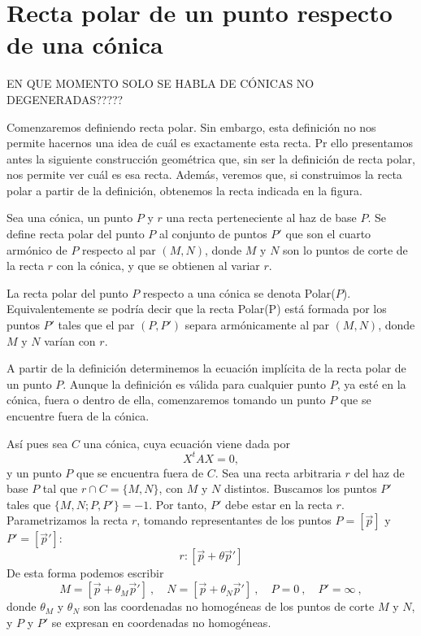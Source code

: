 \section{Recta polar de un punto respecto de una cónica}
EN QUE MOMENTO SOLO SE HABLA DE CÓNICAS NO DEGENERADAS?????

Comenzaremos definiendo recta polar. Sin embargo, esta definición no nos permite hacernos una idea de cuál es exactamente esta recta. Pr ello presentamos antes la siguiente construcción geométrica que, sin ser la definición de recta polar, nos permite ver cuál es esa recta. Además, veremos que, si construimos la recta polar a partir de la definición, obtenemos la recta indicada en la figura.
\begin{defi}
	Sea una cónica, un punto $P$ y $r$ una recta perteneciente al haz de base $P$. Se define recta polar del punto $P$ al conjunto de puntos $P'$ que son el cuarto armónico de $P$ respecto al par $(M,N)$, donde $M$ y $N$ son lo puntos de corte de la recta $r$ con la cónica, y que se obtienen al variar $r$.
\end{defi}

La recta polar del punto $P$ respecto a una cónica se denota Polar($P$). Equivalentemente se podría decir que la recta Polar(P) está formada por los puntos $P'$ tales que el par $(P,P')$ separa armónicamente al par $(M,N)$, donde $M$ y $N$ varían con $r$.

A partir de la definición determinemos la ecuación implícita de la recta polar de un punto $P$. Aunque la definición es válida para cualquier punto $P$, ya esté en la cónica, fuera o dentro de ella, comenzaremos tomando un punto $P$ que se encuentre fuera de la cónica. 

Así pues sea $C$ una cónica, cuya ecuación viene dada por
\begin{equation}
X^tAX=0,
\end{equation}
y un punto $P$ que se encuentra fuera de $C$. Sea una recta arbitraria $r$ del haz de base $P$ tal que $r\cap C=\{M,N\}$, con $M$ y $N$ distintos. Buscamos los puntos $P'$ tales que $\{M,N;P,P'\}=-1$. Por tanto, $P'$ debe estar en la recta $r$. Parametrizamos la recta $r$, tomando representantes de los puntos $P=[\vec{p}]$ y $P'=[\vec{p}']$:
\begin{equation*}
r:[\vec{p}+\theta \vec{p}']
\end{equation*}
De esta forma podemos escribir
\begin{equation*}
M=[\vec{p}+\theta_M \vec{p}'] \ , \quad N=[\vec{p}+\theta_N \vec{p}'] \ , \quad P=0 \ , \quad P'=\infty \ ,
\end{equation*}
donde $\theta_M$ y $\theta_N$ son las coordenadas no homogéneas de los puntos de corte $M$ y $N$, y $P$ y $P'$ se expresan en coordenadas no homogéneas.

